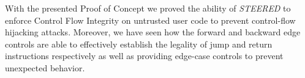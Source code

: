 With the presented Proof of Concept we proved the ability of \textit{STEERED} to
enforce Control Flow Integrity on untrusted user code to prevent control-flow
hijacking attacks. Moreover, we have seen how the forward and backward edge
controls are able to effectively establish the legality of jump and return
instructions respectively as well as providing edge-case controls to prevent
unexpected behavior.
